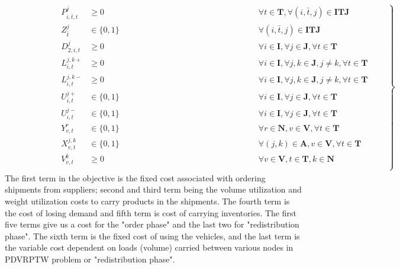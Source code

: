 \documentclass[11pt,letter]{article}
\begin{document}
\begin{align}
\left. \qquad \qquad \qquad
\begin{matrix}
P_{i,\bar{t},t}^{j} & \geq 0 & \qquad \qquad \qquad \qquad \qquad \qquad \qquad \qquad \forall t \in \textbf{T}, \forall (i,\bar{t},j)\in \textbf{ITJ} \\
Z_{\bar{t}}^{j} & \in \{0,1\} & \qquad \qquad \qquad \qquad \qquad \qquad \qquad \qquad \forall (i,\bar{t},j)\in \textbf{ITJ} \\
D_{2,i,t}^{j} & \geq 0 & \qquad \qquad \qquad \qquad \qquad \qquad \qquad \qquad \forall i\in \textbf{I},\forall j\in \textbf{J}, \forall t \in \textbf{T}  \\
L_{i,t}^{j,k{+}} & \geq 0 & \qquad \qquad \qquad \qquad \qquad \qquad \qquad \qquad \forall i\in \textbf{I},\forall j,k\in \textbf{J}, j\neq k, \forall t \in \textbf{T}  \\
L_{i,t}^{j,k{-}} & \geq 0 & \qquad \qquad \qquad \qquad \qquad \qquad \qquad \qquad \forall i\in \textbf{I},\forall j,k\in \textbf{J}, j\neq k, \forall t \in \textbf{T}  \\
U_{i,t}^{j{+}} & \in \{0,1\} & \qquad \qquad \qquad \qquad \qquad \qquad \qquad \qquad \forall i\in \textbf{I}, \forall j\in \textbf{J}, \forall t \in \textbf{T}  \\
U_{i,t}^{j{-}} & \in \{0,1\} & \qquad \qquad \qquad \qquad \qquad \qquad \qquad \qquad \forall i\in \textbf{I}, \forall j\in \textbf{J}, \forall t \in \textbf{T}  \\
Y_{v,t}^{r} & \in \{0,1\} & \qquad \qquad \qquad \qquad \qquad \qquad \qquad \qquad \forall r \in \textbf{N}, v \in \textbf{V}, \forall t \in \textbf{T}  \\
X_{v,t}^{j,k} & \in \{0,1\} & \qquad \qquad \qquad \qquad \qquad \qquad \qquad \qquad \forall (j,k) \in \textbf{A}, v \in \textbf{V}, \forall t \in \textbf{T}  \\
V_{v,t}^{k} & \geq 0 & \qquad \qquad \qquad \qquad \qquad \qquad \qquad \qquad \forall v \in \textbf{V}, t \in \textbf{T}, k \in \textbf{N}  \\
\end{matrix}
\qquad \right\}
\end{align}
The first term in the objective is the fixed cost associated with ordering shipments from suppliers; second and third term being the volume utilization and weight utilization costs to carry products in the shipments. The fourth term is the cost of losing demand and fifth term is cost of carrying inventories. The first five terms give us a cost for the "order phase" and the last two for "redistribution phase". The sixth term is the fixed cost of using the vehicles, and the last term is the variable cost dependent on loads (volume) carried between various nodes in PDVRPTW problem or "redistribution phase". \\
\end{document}
